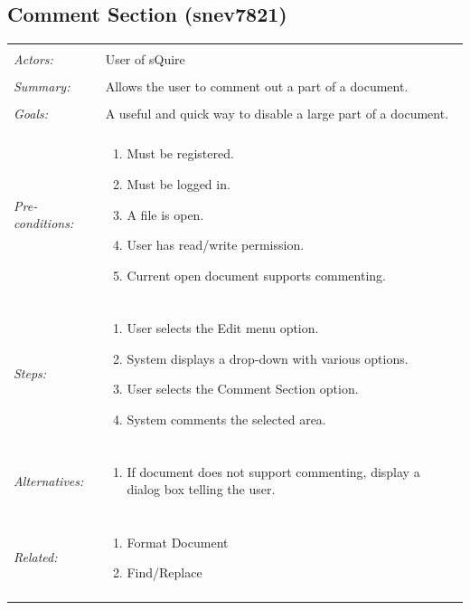 \documentclass[11pt]{report}
\begin{document}
\subsection{Comment Section  (snev7821)}
\begin{tabular}{ p{2cm} p{12cm} }
\hline
\\
	\textit{Actors:} & User of sQuire \\
	\\
	\textit{Summary:} &  Allows the user to comment out a part of a document. \\
	\\
	\textit{Goals:} & A useful and quick way to disable a large part of a document. \\
	\\
	\textit{Pre-conditions:} & \begin{enumerate}
		\item Must be registered.
		\item Must be logged in.
		\item A file is open.
		\item User has read/write permission.
		\item Current open document supports commenting.
	\end{enumerate} \\
	\\
	\textit{Steps:} & \begin{enumerate}
		\item User selects the Edit menu option.
		\item System displays a drop-down with various options.
		\item User selects the Comment Section option.
		\item System comments the selected area.
	\end{enumerate} \\
	\\
	\textit{Alternatives:} & \begin{enumerate}
		\item If document does not support commenting, display a dialog box telling the user.
	\end{enumerate} \\
	\\
	\textit{Related:} & \begin{enumerate}
		\item Format Document
		\item Find/Replace
	\end{enumerate} \\
	\\
\hline
\end{tabular}
\newpage
\end{document}
